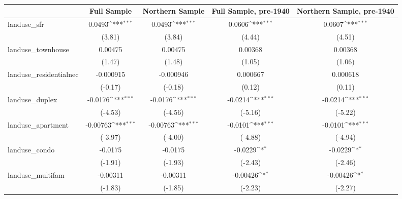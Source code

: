 \begin{table}[htbp]\centering
\def\sym#1{\ifmmode^{#1}\else\(^{#1}\)\fi}
\caption{ \label{tab1}}
\begin{tabular}{l*{4}{c}}
\toprule
                    &\multicolumn{1}{c}{Full Sample}&\multicolumn{1}{c}{Northern Sample}&\multicolumn{1}{c}{Full Sample, pre-1940}&\multicolumn{1}{c}{Northern Sample, pre-1940}\\
\midrule
landuse\_sfr         &      0.0493\sym{***}&      0.0493\sym{***}&      0.0606\sym{***}&      0.0607\sym{***}\\
                    &      (3.81)         &      (3.84)         &      (4.44)         &      (4.51)         \\
\addlinespace
landuse\_townhouse   &     0.00475         &     0.00475         &     0.00368         &     0.00368         \\
                    &      (1.47)         &      (1.48)         &      (1.05)         &      (1.06)         \\
\addlinespace
landuse\_residentialnec&   -0.000915         &   -0.000946         &    0.000667         &    0.000618         \\
                    &     (-0.17)         &     (-0.18)         &      (0.12)         &      (0.11)         \\
\addlinespace
landuse\_duplex      &     -0.0176\sym{***}&     -0.0176\sym{***}&     -0.0214\sym{***}&     -0.0214\sym{***}\\
                    &     (-4.53)         &     (-4.56)         &     (-5.16)         &     (-5.22)         \\
\addlinespace
landuse\_apartment   &    -0.00763\sym{***}&    -0.00763\sym{***}&     -0.0101\sym{***}&     -0.0101\sym{***}\\
                    &     (-3.97)         &     (-4.00)         &     (-4.88)         &     (-4.94)         \\
\addlinespace
landuse\_condo       &     -0.0175         &     -0.0175         &     -0.0229\sym{*}  &     -0.0229\sym{*}  \\
                    &     (-1.91)         &     (-1.93)         &     (-2.43)         &     (-2.46)         \\
\addlinespace
landuse\_multifam    &    -0.00311         &    -0.00311         &    -0.00426\sym{*}  &    -0.00426\sym{*}  \\
                    &     (-1.83)         &     (-1.85)         &     (-2.23)         &     (-2.27)         \\

\end{tabular}
\end{table}
